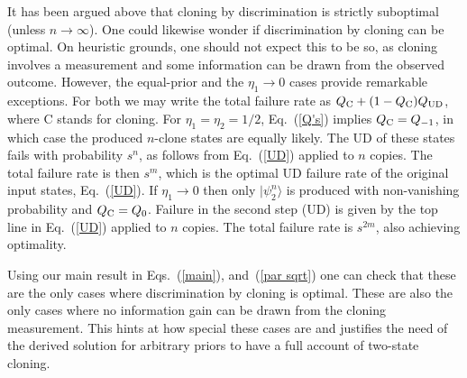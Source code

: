\documentclass[aps,prl,twocolumn,showpacs]{revtex4}
\begin{document}

It has been argued above that cloning by discrimination is strictly suboptimal (unless $n\to \infty$).
One could likewise wonder if discrimination by cloning can be optimal. On heuristic grounds, one should not expect this to be so, as cloning involves a measurement and some information can be drawn from the observed outcome. However, the equal-prior and the $\eta_1\to 0$ cases provide remarkable exceptions. For both we may write the total failure rate as $Q_{\rm C} + (1-Q_{\rm C})Q_{\rm UD}$, where C stands for cloning. For $\eta_1 = \eta_2= 1/2$, Eq.~(\ref{Q's}) implies $Q_{\rm C}=Q_{-1}$, in which case the produced $n$-clone states are equally likely. The UD of these states fails with probability $s^{n}$, as follows from Eq.~(\ref{UD}) applied to $n$ copies. The total failure rate is then $s^m$, which is the optimal UD failure rate of the original input states, Eq.~(\ref{UD}). If $\eta_1\to 0$ then only $|\psi^n_2\rangle$ is produced with non-vanishing probability and  $Q_{\rm C}=Q_{0}$. Failure in the second step (UD) is given by the top line in Eq.~(\ref{UD}) applied to $n$ copies. The total failure rate is $s^{2m}$, also achieving optimality. 

Using our main result in Eqs.~(\ref{main}), and~(\ref{par sqrt}) one can check that these are the only cases where discrimination by cloning is optimal. These are also the only cases where no information gain can be drawn from the cloning measurement.  This hints at how special these cases are and justifies the need of the derived solution for arbitrary priors to have a full account of two-state cloning. 
\end{document}
